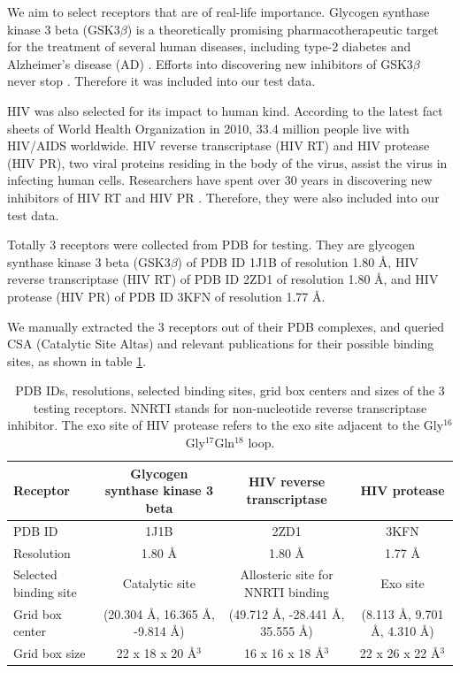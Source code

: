 \documentclass[10pt, conference, compsocconf]{../IEEEtran}
\begin{document}
We aim to select receptors that are of real-life importance. Glycogen synthase kinase 3 beta (GSK3$\beta$) is a theoretically promising pharmacotherapeutic target for the treatment of several human diseases, including type-2 diabetes \cite{247} and Alzheimer's disease (AD) \cite{248}. Efforts into discovering new inhibitors of GSK3$\beta$ never stop \cite{246}. Therefore it was included into our test data.

HIV was also selected for its impact to human kind. According to the latest fact sheets of World Health Organization in 2010, 33.4 million people live with HIV/AIDS worldwide. HIV reverse transcriptase (HIV RT) and HIV protease (HIV PR), two viral proteins residing in the body of the virus, assist the virus in infecting human cells. Researchers have spent over 30 years in discovering new inhibitors of HIV RT and HIV PR \cite{221,222,223}. Therefore, they were also included into our test data.

Totally 3 receptors were collected from PDB \cite{96} for testing. They are glycogen synthase kinase 3 beta (GSK3$\beta$) of PDB ID 1J1B \cite{245} of resolution 1.80 \AA, HIV reverse transcriptase (HIV RT) of PDB ID 2ZD1 \cite{180} of resolution 1.80 \AA, and HIV protease (HIV PR) of PDB ID 3KFN \cite{243} of resolution 1.77 \AA.

We manually extracted the 3 receptors out of their PDB complexes, and queried CSA (Catalytic Site Altas) \cite{206} and relevant publications \cite{245,246,180,221,222,223,243} for their possible binding sites, as shown in table \ref{tab:searchspace}.

\begin{table}
\centering
\begin{tabular*}
{\linewidth}
{@{\extracolsep{\fill}}lccc}
\noalign{\smallskip}
\toprule
Receptor & Glycogen synthase kinase 3 beta & HIV reverse transcriptase & HIV protease\\
\midrule
\noalign{\smallskip}
PDB ID & 1J1B & 2ZD1 & 3KFN\\
Resolution & 1.80 \AA & 1.80 \AA & 1.77 \AA\\
Selected binding site & Catalytic site & Allosteric site for NNRTI binding & Exo site\\
Grid box center & (20.304 \AA, 16.365 \AA, -9.814 \AA) & (49.712 \AA, -28.441 \AA, 35.555 \AA) & (8.113 \AA, 9.701 \AA, 4.310 \AA) \\
Grid box size & 22 x 18 x 20 \AA$^3$ & 16 x 16 x 18 \AA$^3$ & 22 x 26 x 22 \AA$^3$\\
\bottomrule
\end{tabular*}
\caption{PDB IDs, resolutions, selected binding sites, grid box centers and sizes of the 3 testing receptors. NNRTI stands for non-nucleotide reverse transcriptase inhibitor. The exo site of HIV protease refers to the exo site adjacent to the Gly$^{16}$Gly$^{17}$Gln$^{18}$ loop.}
\label{tab:searchspace}
\end{table}
\end{document}

